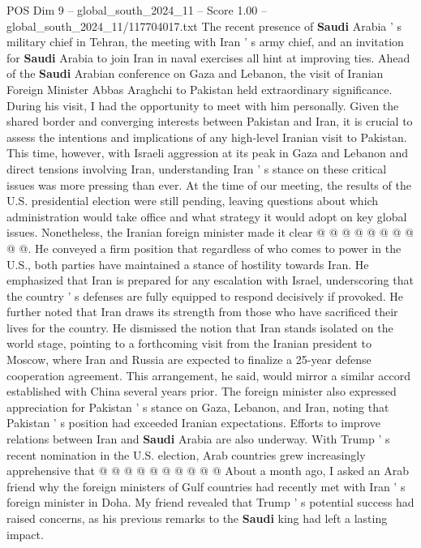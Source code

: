 \begin{textsample}{POS Dim 9 – global\_south\_2024\_11 – Score 1.00 – global\_south\_2024\_11/117704017.txt}  \label{ex:f9_pos_032}
The recent presence of \textbf{Saudi} Arabia ' s military chief in Tehran, the meeting with Iran ' s army chief, and an invitation for \textbf{Saudi} Arabia to join Iran in naval exercises all hint at improving ties.
Ahead of the \textbf{Saudi} Arabian conference on Gaza and Lebanon, the visit of Iranian Foreign Minister Abbas Araghchi to Pakistan held extraordinary significance.
During his visit, I had the opportunity to meet with him personally.
Given the shared border and converging interests between Pakistan and Iran, it is crucial to assess the intentions and implications of any high-level Iranian visit to Pakistan.
This time, however, with Israeli aggression at its peak in Gaza and Lebanon and direct tensions involving Iran, understanding Iran ' s stance on these critical issues was more pressing than ever.
At the time of our meeting, the results of the U.S. presidential election were still pending, leaving questions about which administration would take office and what strategy it would adopt on key global issues.
Nonetheless, the Iranian foreign minister made it clear @ @ @ @ @ @ @ @ @ @.
He conveyed a firm position that regardless of who comes to power in the U.S., both parties have maintained a stance of hostility towards Iran.
He emphasized that Iran is prepared for any escalation with Israel, underscoring that the country ' s defenses are fully equipped to respond decisively if provoked.
He further noted that Iran draws its strength from those who have sacrificed their lives for the country.
He dismissed the notion that Iran stands isolated on the world stage, pointing to a forthcoming visit from the Iranian president to Moscow, where Iran and Russia are expected to finalize a 25-year defense cooperation agreement.
This arrangement, he said, would mirror a similar accord established with China several years prior.
The foreign minister also expressed appreciation for Pakistan ' s stance on Gaza, Lebanon, and Iran, noting that Pakistan ' s position had exceeded Iranian expectations.
Efforts to improve relations between Iran and \textbf{Saudi} Arabia are also underway.
With Trump ' s recent nomination in the U.S. election, Arab countries grew increasingly apprehensive that @ @ @ @ @ @ @ @ @ @ About a month ago, I asked an Arab friend why the foreign ministers of Gulf countries had recently met with Iran ' s foreign minister in Doha.
My friend revealed that Trump ' s potential success had raised concerns, as his previous remarks to the \textbf{Saudi} king had left a lasting impact.

\end{textsample}
